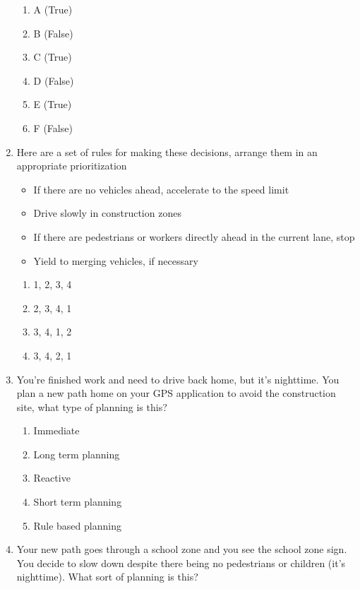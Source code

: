 \begin{enumerate}
\begin{enumerate}
\item A (True)
\item B (False)
\item C (True)
\item D (False)
\item E (True)
\item F (False)
\end{enumerate}

\item Here are a set of rules for making these decisions, arrange them in an appropriate prioritization

\begin{itemize}
\item If there are no vehicles ahead, accelerate to the speed limit
\item Drive slowly in construction zones
\item If there are pedestrians or workers directly ahead in the current lane, stop
\item Yield to merging vehicles, if necessary 
\end{itemize}

\begin{enumerate}
\item 1, 2, 3, 4
\item 2, 3, 4, 1
\item 3, 4, 1, 2
\item 3, 4, 2, 1
\end{enumerate}

\item  You’re finished work and need to drive back home, but it’s nighttime.
You plan a new path home on your GPS application to avoid the construction site, what type of planning is this?

\begin{enumerate}
\item Immediate
\item Long term planning
\item Reactive
\item Short term planning
\item Rule based planning
\end{enumerate}


\item Your new path goes through a school zone and you see the school zone sign. You decide to slow down despite there being no pedestrians or children (it’s nighttime). What sort of planning is this?


\end{enumerate}
